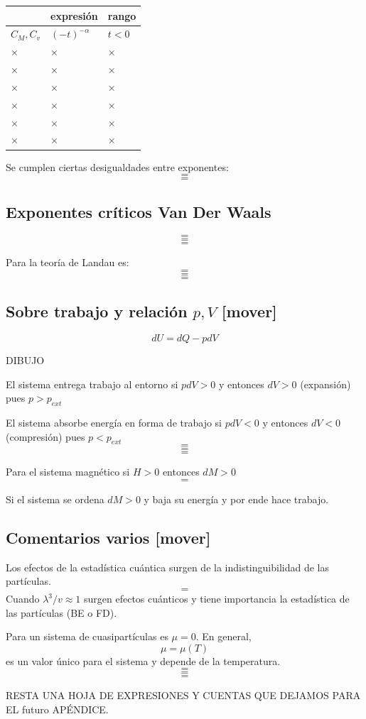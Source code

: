 \documentclass[10pt,oneside]{CBFT_book}
\begin{document}
\begin{center}
\begin{tabular}{lll}
 & expresión & rango \\
\hline
$C_M, C_v$ & $(-t)^{-\alpha}$ & $t < 0$  \\
× & × & ×\\
× & × & ×\\
× & × & ×\\
× & × & ×\\
× & × & ×\\
× & × & ×
\end{tabular}
\end{center}

Se cumplen ciertas desigualdades entre exponentes:
\[=\]
\[=\]

\subsection{Exponentes críticos Van Der Waals} 

\[=\]
\[=\]
\[=\]

Para la teoría de Landau es:
\[=\]
\[=\]
\[=\]

\subsection{Sobre trabajo y relación $p,V$ [mover]}

\[ 
	dU = dQ - p dV
\]

DIBUJO 

El sistema entrega trabajo al entorno si $ pdV > 0 $ y entonces $ dV > 0 $ (expansión)
pues $ p > p_{ext} $

El sistema absorbe energía en forma de trabajo si $ pdV < 0 $ y entonces $ dV < 0 $ (compresión)
pues $ p < p_{ext} $
\[=\]
\[=\]
\[=\]

Para el sistema magnético si $ H > 0 $ entonces $ dM > 0 $
\[=\]

Si el sistema se ordena $dM>0$ y baja su energía y por ende hace trabajo.

\subsection{Comentarios varios [mover]}

Los efectos de la estadística cuántica surgen de la indistinguibilidad de las partículas.
\[=\]
Cuando $\lambda^3/v \approx 1$ surgen efectos cuánticos y tiene importancia la estadística de las
partículas (BE o FD).

Para un sistema de cuasipartículas es $\mu=0$. En general,
\[
	\mu = \mu(T)
\]
es un valor único para el sistema y depende de la temperatura.
\[=\]
\[=\]
\[=\]

RESTA UNA HOJA DE EXPRESIONES Y CUENTAS QUE DEJAMOS PARA EL futuro APÉNDICE.

\end{document}

